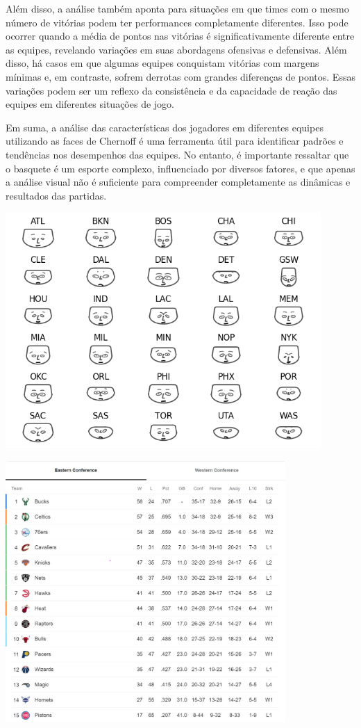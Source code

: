 \documentclass[
]{book}
\begin{document}
Além disso, a análise também aponta para situações em que times com o mesmo número de vitórias podem ter performances completamente diferentes. Isso pode ocorrer quando a média de pontos nas vitórias é significativamente diferente entre as equipes, revelando variações em suas abordagens ofensivas e defensivas. Além disso, há casos em que algumas equipes conquistam vitórias com margens mínimas e, em contraste, sofrem derrotas com grandes diferenças de pontos. Essas variações podem ser um reflexo da consistência e da capacidade de reação das equipes em diferentes situações de jogo.

Em suma, a análise das características dos jogadores em diferentes equipes utilizando as faces de Chernoff é uma ferramenta útil para identificar padrões e tendências nos desempenhos das equipes. No entanto, é importante ressaltar que o basquete é um esporte complexo, influenciado por diversos fatores, e que apenas a análise visual não é suficiente para compreender completamente as dinâmicas e resultados das partidas.

\includegraphics[width=0.9\textwidth,height=\textheight]{imagens/20.png}

\includegraphics[width=0.8\textwidth,height=\textheight]{imagens/21.jpeg}
\end{document}

